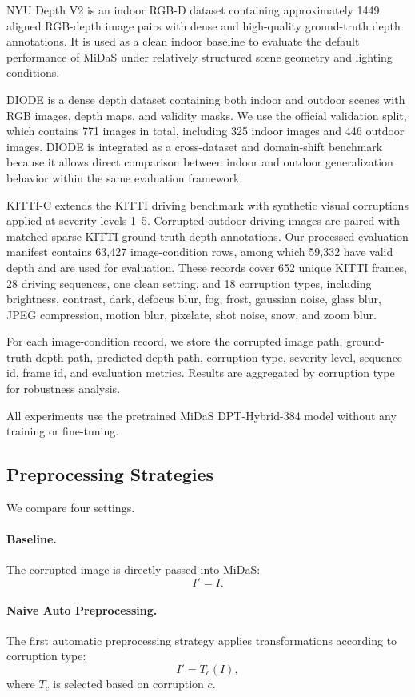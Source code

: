\documentclass[10pt]{article}
\begin{document}
NYU Depth V2 is an indoor RGB-D dataset containing approximately 1449 aligned RGB-depth image pairs with dense and high-quality ground-truth depth annotations. It is used as a clean indoor baseline to evaluate the default performance of MiDaS under relatively structured scene geometry and lighting conditions.

DIODE is a dense depth dataset containing both indoor and outdoor scenes with RGB images, depth maps, and validity masks. We use the official validation split, which contains 771 images in total, including 325 indoor images and 446 outdoor images. DIODE is integrated as a cross-dataset and domain-shift benchmark because it allows direct comparison between indoor and outdoor generalization behavior within the same evaluation framework.

KITTI-C extends the KITTI driving benchmark with synthetic visual corruptions applied at severity levels 1--5. Corrupted outdoor driving images are paired with matched sparse KITTI ground-truth depth annotations. Our processed evaluation manifest contains 63,427 image-condition rows, among which 59,332 have valid depth and are used for evaluation. These records cover 652 unique KITTI frames, 28 driving sequences, one clean setting, and 18 corruption types, including brightness, contrast, dark, defocus blur, fog, frost, gaussian noise, glass blur, JPEG compression, motion blur, pixelate, shot noise, snow, and zoom blur.

For each image-condition record, we store the corrupted image path, ground-truth depth path, predicted depth path, corruption type, severity level, sequence id, frame id, and evaluation metrics. Results are aggregated by corruption type for robustness analysis.

All experiments use the pretrained MiDaS DPT-Hybrid-384 model without any training or fine-tuning.

\subsection{Preprocessing Strategies}

We compare four settings.

\paragraph{Baseline.}
The corrupted image is directly passed into MiDaS:
\[
I' = I.
\]

\paragraph{Naive Auto Preprocessing.}
The first automatic preprocessing strategy applies transformations according to corruption type:
\[
I' = T_c(I),
\]
where $T_c$ is selected based on corruption $c$.
\end{document}
